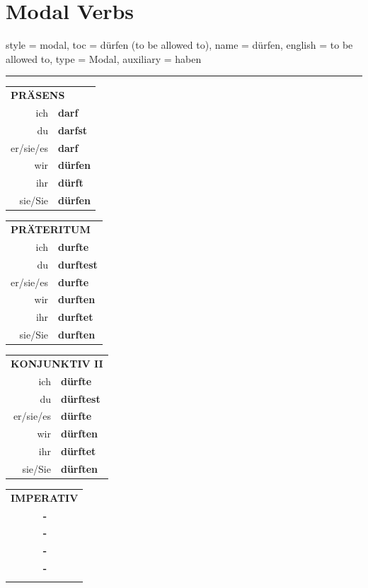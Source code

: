 \chapter{Modal Verbs}

\begin{verbentry}{
  style = {modal},
  toc = {dürfen (to be allowed to)},
  name = {dürfen},
  english = {to be allowed to},
  type = {Modal},
  auxiliary = {haben}
}
 
     \vspace{5pt}
    \hrule
    \vspace{5pt}
  \begin{tabular}{rl}
     \multicolumn{2}{l}{\textbf{PRÄSENS} }\\
    ich & \textbf{darf}\\
    du & \textbf{darfst}\\
    er/sie/es & \textbf{darf}\\
    wir & \textbf{dürfen}\\
    ihr & \textbf{dürft}\\
    sie/Sie & \textbf{dürfen}\\
  \end{tabular}
  \hfill
     \begin{tabular}{rl}
    \multicolumn{2}{l}{\textbf{PRÄTERITUM} }\\
    ich & \textbf{durfte}\\
    du & \textbf{durftest}\\
    er/sie/es & \textbf{durfte}\\
    wir & \textbf{durften}\\
    ihr & \textbf{durftet}\\
    sie/Sie & \textbf{durften}\\
  \end{tabular}
   \hfill
     \begin{tabular}{rl}
    \multicolumn{2}{l}{\textbf{KONJUNKTIV II} }\\
    ich & \textbf{dürfte}\\
    du & \textbf{dürftest}\\
    er/sie/es & \textbf{dürfte}\\
    wir & \textbf{dürften}\\
    ihr & \textbf{dürftet}\\
    sie/Sie & \textbf{dürften}\\
  \end{tabular}
  \hfill
  \begin{tabular}{rl}
     \multicolumn{2}{l}{\textbf{IMPERATIV} }\\
   & \textbf{-}\\
   & \textbf{-}\\
   & \textbf{-}\\
   & \textbf{-}\\
   & \vspace{10pt}
  \end{tabular}


\end{verbentry}
